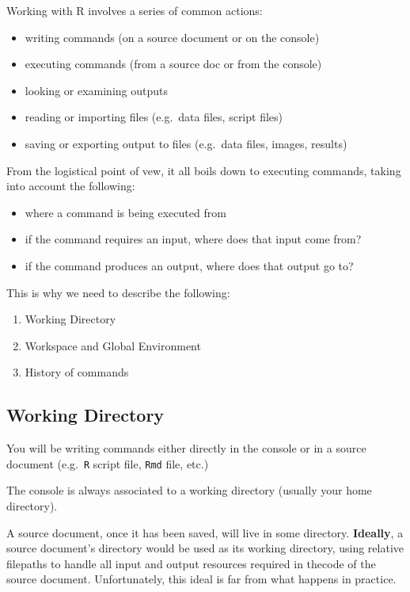 \documentclass[
]{book}
\begin{document}
Working with R involves a series of common actions:

\begin{itemize}
\item
  writing commands (on a source document or on the console)
\item
  executing commands (from a source doc or from the console)
\item
  looking or examining outputs
\item
  reading or importing files (e.g.~data files, script files)
\item
  saving or exporting output to files (e.g.~data files, images, results)
\end{itemize}

From the logistical point of vew, it all boils down to executing commands,
taking into account the following:

\begin{itemize}
\item
  where a command is being executed from
\item
  if the command requires an input, where does that input come from?
\item
  if the command produces an output, where does that output go to?
\end{itemize}

This is why we need to describe the following:

\begin{enumerate}
\def\labelenumi{\arabic{enumi}.}
\item
  Working Directory
\item
  Workspace and Global Environment
\item
  History of commands
\end{enumerate}

\hypertarget{working-directory-1}{%
\subsection{Working Directory}\label{working-directory-1}}

You will be writing commands either directly in the console or in a source
document (e.g.~\texttt{R} script file, \texttt{Rmd} file, etc.)

The console is always associated to a working directory (usually your home
directory).

A source document, once it has been saved, will live in some directory.
\textbf{Ideally}, a source document's directory would be used as its working directory,
using relative filepaths to handle all input and output resources required in
thecode of the source document. Unfortunately, this ideal is far from what
happens in practice.
\end{document}
